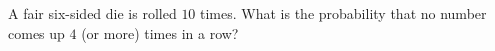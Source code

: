 A fair six-sided die is rolled $10$ times. What is the probability that no number comes up $4$ (or more) times in a row?
